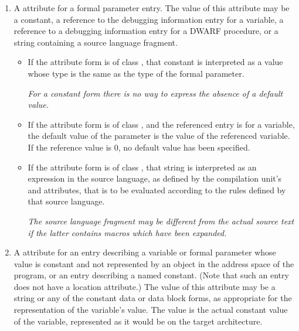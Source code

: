 \begin{enumerate}[1. ]
\item \hypertarget{chap:DWATdefaultvaluedefaultvalueofparameter}{}
A \DWATdefaultvalueDEFN{} attribute
for 
a formal parameter entry. 
The value of this attribute may be a constant, 
\db
a reference to the debugging information entry for a variable, 
\db
a reference to a debugging information entry 
\bb
for a DWARF procedure, 
or a string containing a source language fragment.
\eb
\begin{itemize}
\item  
If the attribute form is of class \CLASSconstant, that constant is 
interpreted as a value whose type is the same as 
the type of the formal parameter. 

\bb
\textit{For a constant form there is no way to 
express the absence of a default value.}
\eb

\item
If the attribute
form is of class \CLASSreference, and the referenced entry is for a
variable, the default value of the parameter is the value of the
referenced variable.  If the reference value is 0, no default value
has been specified.
 
\db
\item
\bb
If the attribute form is of class \CLASSstring, that string is interpreted
as an expression in the source language, as defined by the compilation
unit's \DWATlanguagename{} and \DWATlanguageversion{} attributes, that is 
to be evaluated according to the rules defined by that source language.

\textit{The source language fragment may be different from the actual source
text if the latter contains macros which have been expanded.}
\eb
\end{itemize}
\db
\item \hypertarget{chap:DWATconstvalueconstantobject}{}
A \DWATconstvalueDEFN{} attribute
for an entry describing a
variable or formal parameter whose value is constant and not
represented by an object in the address space of the program,
or an entry describing a named constant. (Note that such
an entry does not have a location attribute.) The value of
this attribute may be a string or any of the constant data
or data block forms, 
as appropriate for the representation
of the variable's value. The value is the actual constant
value of the variable, represented as it would be on the
target architecture.  


\end{enumerate}
